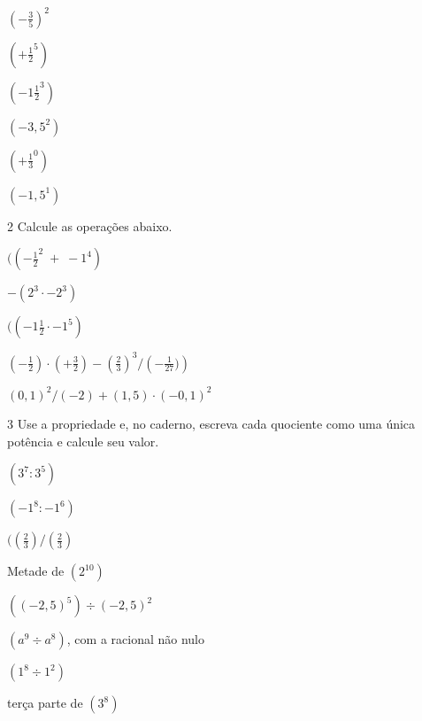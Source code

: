 \begin{escolha}
\item $\left( - \frac{3}{5}\right )^2$  
\item $( + \frac{1}{2}^5)$  
\item $( - 1\frac{1}{2}^3)$  
\item $( -3,5^2)$  
\item $( + \frac{1}{3}^0)$  
\item $(-1,5^1)$  
\end{escolha}


\num{2} Calcule as operações abaixo.

\begin{escolha}
\item $(( - \frac{1}{2}^2 \; + \; -1^4)$ 
\item $ - (2^3 \cdot -2^3)$ 
\item $(( - 1\frac{1}{2} \cdot -1^5)$ 
\item $\left ( - \frac{1}{2} \right) \cdot \left( + \frac{3}{2} \right) - \left ( \frac{2}{3} \right)^{3} / \left ( - \frac{1}{27}) \right)$  
\item $(0,1) ^2 / (-2) + (1,5) \cdot (-0,1)^2$ 
\end{escolha}







\num{3} Use a propriedade e, no caderno, escreva cada quociente como uma
única potência e calcule seu valor.


\begin{escolha}
\item $(3^7:3^5)$ 
\item $(-1^8:-1^6)$ 
\item $(\left( \frac{2}{3} \right) / \left ( \frac{2}{3} \right)$ 
\item Metade de $(2^10)$ 
\item $((-2,5)^5) \div (-2,5)^2$ 
\item $(a^9 \div a^8)$, com a racional não nulo 
\item $(1^8 \div 1^2)$ 
\item terça parte de $(3^8)$ 
\end{escolha}



